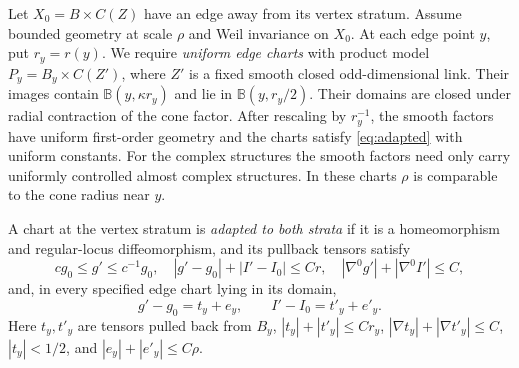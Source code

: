 Let $X_0=B\times C(Z)$ have an edge away from its vertex stratum.
Assume bounded geometry at scale $\rho$ and Weil invariance on
$X_0$. At each edge point $y$, put $r_y=r(y)$. We require
\emph{uniform edge charts} with product model
$P_y=B_y\times C(Z')$, where $Z'$ is a fixed smooth closed
odd-dimensional link. Their images contain
$\mathbb B(y,\kappa r_y)$ and lie in
$\mathbb B(y,r_y/2)$. Their domains are closed under radial
contraction of the cone factor. After rescaling by $r_y^{-1}$,
the smooth factors have uniform first-order geometry and the
charts satisfy \eqref{eq:adapted} with uniform constants. For
the complex structures the smooth factors need only carry
uniformly controlled almost complex structures. In these charts
$\rho$ is comparable to the cone radius near $y$.

\begin{definition}\label{def:two-level}
A chart at the vertex stratum is \emph{adapted to both strata}
if it is a homeomorphism and regular-locus diffeomorphism, and
its pullback tensors satisfy
\begin{equation}\label{eq:two-level}
 cg_0\le g'\le c^{-1}g_0,\quad
 |g'-g_0|+|I'-I_0|\le Cr,\quad
 |\nabla^0g'|+|\nabla^0I'|\le C,
\end{equation}
and, in every specified edge chart lying in its domain,
\begin{equation}\label{eq:edge-split}
 g'-g_0=t_y+e_y,\qquad I'-I_0=t'_y+e'_y.
\end{equation}
Here $t_y,t'_y$ are tensors pulled back from $B_y$,
$|t_y|+|t'_y|\le Cr_y$, $|\nabla t_y|+|\nabla t'_y|\le C$,
$|t_y|<1/2$, and $|e_y|+|e'_y|\le C\rho$.
\end{definition}

